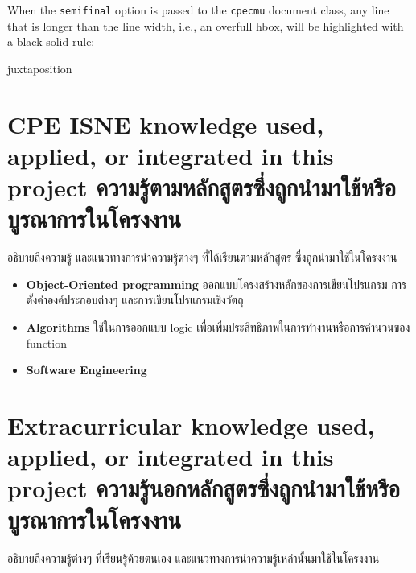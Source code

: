 When the \verb.semifinal. option is passed to the \verb.cpecmu. document class,
any line that is longer than the line width, i.e., an overfull hbox, will be
highlighted with a black solid rule:
\begin{center}
\begin{minipage}{2em}
juxtaposition
\end{minipage}
\end{center}

\section{\ifenglish%
\ifcpe CPE \else ISNE \fi knowledge used, applied, or integrated in this project
\else%
ความรู้ตามหลักสูตรซึ่งถูกนำมาใช้หรือบูรณาการในโครงงาน
\fi
}

อธิบายถึงความรู้ และแนวทางการนำความรู้ต่างๆ ที่ได้เรียนตามหลักสูตร ซึ่งถูกนำมาใช้ในโครงงาน
\begin{itemize}
  \item \textbf{Object-Oriented programming} ออกแบบโครงสร้างหลักของการเขียนโปรแกรม การตั้งค่าองค์ประกอบต่างๆ และการเขียนโปรแกรมเชิงวัตถุ
  \item \textbf{Algorithms} ใช้ในการออกแบบ logic เพื่อเพิ่มประสิทธิภาพในการทำงานหรือการคำนวนของ function
  \item \textbf{Software Engineering} 
\end{itemize}

\section{\ifenglish%
Extracurricular knowledge used, applied, or integrated in this project
\else%
ความรู้นอกหลักสูตรซึ่งถูกนำมาใช้หรือบูรณาการในโครงงาน
\fi
}

อธิบายถึงความรู้ต่างๆ ที่เรียนรู้ด้วยตนเอง และแนวทางการนำความรู้เหล่านั้นมาใช้ในโครงงาน
